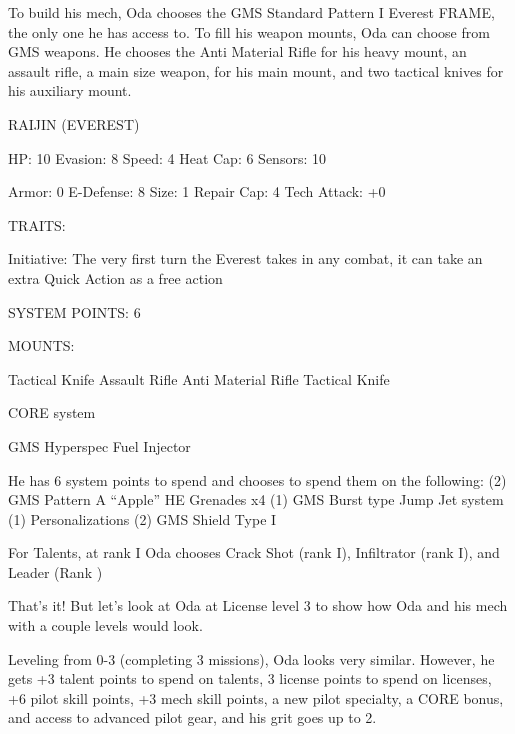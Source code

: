 To build his mech, Oda chooses the GMS Standard Pattern I Everest FRAME, the only one he
has access to. To fill his weapon mounts, Oda can choose from GMS weapons. He chooses the
Anti Material Rifle for his heavy mount, an assault rifle, a main size weapon, for his main mount,
and two tactical knives for his auxiliary mount.





                                             RAIJIN (EVEREST)

  HP: 10          Evasion: 8                             Speed: 4            Heat Cap: 6        Sensors: 10

  Armor: 0        E-Defense: 8                           Size: 1             Repair Cap: 4      Tech Attack:
                                                                                                +0

                                                     TRAITS:

  Initiative: The very first turn the Everest takes in any combat, it can take an extra Quick Action as a free
  action

                                               SYSTEM POINTS: 6

                                                    MOUNTS:

  Tactical Knife
                    Assault Rifle                           Anti Material Rifle
  Tactical Knife

                                                  CORE system

                                         GMS Hyperspec Fuel Injector

He has 6 system points to spend and chooses to spend them on the following:
(2) GMS Pattern A “Apple” HE Grenades x4
(1) GMS Burst type Jump Jet system
(1) Personalizations
(2) GMS Shield Type I


For Talents, at rank I Oda chooses Crack Shot (rank I), Infiltrator (rank I), and Leader (Rank )

That’s it! But let’s look at Oda at License level 3 to show how Oda and his mech with a couple
levels would look.


Leveling from 0-3 (completing 3 missions), Oda looks very similar. However, he gets +3 talent
points to spend on talents, 3 license points to spend on licenses, +6 pilot skill points, +3 mech
skill points, a new pilot specialty, a CORE bonus, and access to advanced pilot gear, and his grit
goes up to 2.


